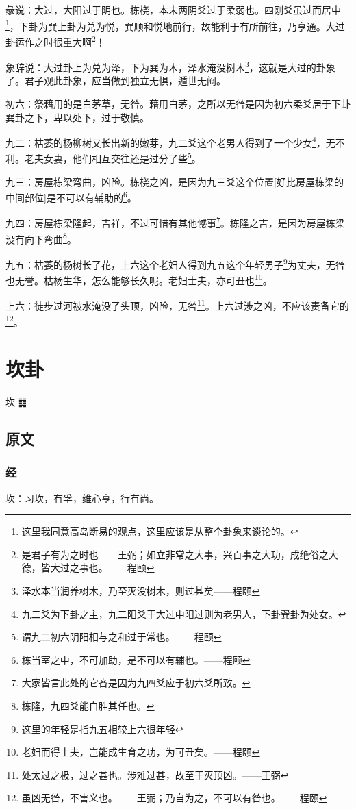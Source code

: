 \documentclass[12pt,oneside]{book}
\begin{document}
彖说：大过，大阳过于阴也。栋桡，本末两阴爻过于柔弱也。四刚爻虽过而居中\footnote{这里我同意高岛断易的观点，这里应该是从整个卦象来谈论的。}，下卦为巽上卦为兑为悦，巽顺和悦地前行，故能利于有所前往，乃亨通。大过卦运作之时很重大啊\footnote{是君子有为之时也——王弼；如立非常之大事，兴百事之大功，成绝俗之大德，皆大过之事也。——程颐}！

象辞说：大过卦上为兑为泽，下为巽为木，泽水淹没树木\footnote{泽水本当润养树木，乃至灭没树木，则过甚矣——程颐}，这就是大过的卦象了。君子观此卦象，应当做到独立无惧，遁世无闷。

初六：祭藉用的是白茅草，无咎。藉用白茅，之所以无咎是因为初六柔爻居于下卦巽卦之下，卑以处下，过于敬慎。

九二：枯萎的杨柳树又长出新的嫩芽，九二爻这个老男人得到了一个少女\footnote{九二爻为下卦之主，九二阳爻于大过中阳过则为老男人，下卦巽卦为处女。}，无不利。老夫女妻，他们相互交往还是过分了些\footnote{谓九二初六阴阳相与之和过于常也。——程颐}。

九三：房屋栋梁弯曲，凶险。栋桡之凶，是因为九三爻这个位置[好比房屋栋梁的中间部位]是不可以有辅助的\footnote{栋当室之中，不可加助，是不可以有辅也。——程颐}。

九四：房屋栋梁隆起，吉祥，不过可惜有其他憾事\footnote{大家皆言此处的它吝是因为九四爻应于初六爻所致。}。栋隆之吉，是因为房屋栋梁没有向下弯曲\footnote{栋隆，九四爻能自胜其任也。}。

九五：枯萎的杨树长了花，上六这个老妇人得到九五这个年轻男子\footnote{这里的年轻是指九五相较上六很年轻}为丈夫，无咎也无誉。枯杨生华，怎么能够长久呢。老妇士夫，亦可丑也\footnote{老妇而得士夫，岂能成生育之功，为可丑矣。——程颐}。

上六：徒步过河被水淹没了头顶，凶险，无咎\footnote{处太过之极，过之甚也。涉难过甚，故至于灭顶凶。——王弼}。上六过涉之凶，不应该责备它的\footnote{虽凶无咎，不害义也。——王弼；乃自为之，不可以有咎也。——程颐}。


\chapter{坎卦}
坎 {\Large ䷜}

\section{原文}

\subsection{经}
坎：习坎，有孚，维心亨，行有尚。
\end{document}
